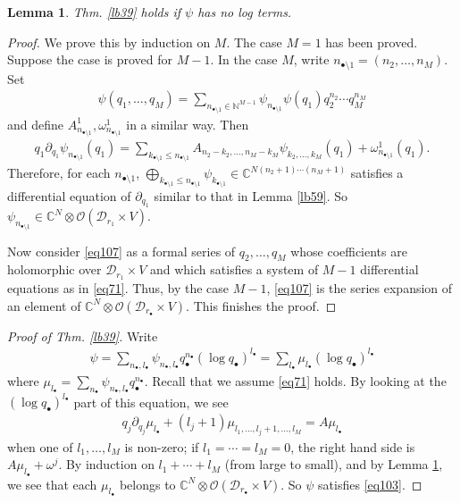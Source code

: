 \documentclass[12pt,a4paper,notitlepage]{article}
\theoremstyle{definition}
\theoremstyle{plain}
\newtheorem{lm}[df]{Lemma}
\newcommand{\mc}{\mathcal}
\newcommand{\scr}{\mathscr}
\newcommand{\blt}{\bullet}
\newcommand{\Cbb}{\mathbb C}
\newcommand{\Nbb}{\mathbb N}
\numberwithin{equation}{section}
\begin{document}
\begin{lm}\label{lb60}
Thm. \ref{lb39} holds if $\psi$ has no log terms. 
\end{lm}
\begin{proof}
We prove this by induction on $M$. The case $M=1$ has been proved. Suppose the case is proved for $M-1$. In the case $M$, write $n_{\blt\setminus 1}=(n_2,\dots,n_M)$. Set
\begin{gather}
\psi(q_1,\dots,q_M)=\sum_{n_{\blt\setminus 1}\in\Nbb^{M-1}}\psi_{n_{\blt\setminus 1}}\psi(q_1)q_2^{n_2}\cdots q_M^{n_M}\label{eq107}
\end{gather}	
and define $A^1_{n_{\blt\setminus 1}},\omega^1_{n_{\blt\setminus 1}}$ in a similar way. Then
\begin{align*}
q_1\partial_{q_1}\psi_{n_{\blt\setminus 1}}(q_1)=\sum_{k_{\blt\setminus 1}\leq n_{\blt\setminus 1}}A_{n_2-k_2,\dots,n_M-k_M}\psi_{k_2,\dots,k_M}(q_1)+\omega^1_{n_{\blt\setminus 1}}(q_1).	
\end{align*}
Therefore, for each $n_{\blt\setminus 1}$, $\bigoplus_{k_{\blt\setminus 1}\leq n_{\blt\setminus 1}}\psi_{k_{\blt\setminus 1}}\in\Cbb^{N(n_2+1)\cdots (n_M+1)}$ satisfies a differential equation of $\partial_{q_1}$ similar to that in Lemma \ref{lb59}. So $\psi_{n_{\blt\setminus 1}}\in\Cbb^N\otimes\scr O(\mc D_{r_1}\times V)$.

Now consider \eqref{eq107} as a formal series of $q_2,\dots,q_M$ whose coefficients are holomorphic over $\mc D_{r_1}\times V$ and which satisfies a system of $M-1$ differential equations as in \eqref{eq71}. Thus, by the case $M-1$, \eqref{eq107} is the series expansion of an element of $\Cbb^N\otimes\scr O(\mc D_{r_\blt}\times V)$. This finishes the proof.
\end{proof}




\begin{proof}[Proof of Thm. \ref{lb39}]
Write
\begin{align*}
\psi=\sum_{n_\blt,l_\blt}\psi_{n_\blt,l_\blt}q_\blt^{n_\blt}(\log q_\blt)^{l_\blt}=\sum_{l_\blt}\mu_{l_\blt}(\log q_\blt)^{l_\blt}	
\end{align*}
where $\mu_{l_\blt}=\sum_{n_\blt}\psi_{n_\blt,l_\blt}q_\blt^{n_\blt}$. Recall that we assume \eqref{eq71} holds. By looking at the  $(\log q_\blt)^{l_\blt}$ part of this equation, we see
\begin{align*}
	q_j\partial_{q_j}\mu_{l_\blt}+(l_j+1)\mu_{l_1,\dots,l_j+1,\dots,l_M}=A\mu_{l_\blt}	
\end{align*}
when one of $l_1,\dots,l_M$ is non-zero; if $l_1=\cdots=l_M=0$, the right hand side is $A\mu_{l_\blt}+\omega^j$. By induction on $l_1+\cdots+l_M$ (from large to small), and by Lemma \ref{lb60}, we see that each $\mu_{l_\blt}$ belongs to  $\Cbb^N\otimes\scr O(\mc D_{r_\blt}\times V)$. So $\psi$ satisfies \eqref{eq103}.
\end{proof}
\end{document}
